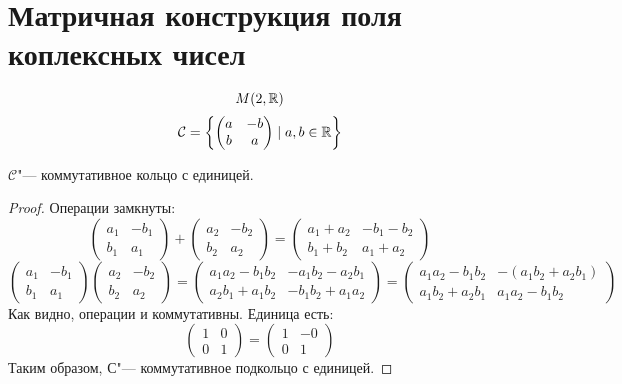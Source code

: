 \section{Матричная конструкция поля коплексных чисел}

$$M(2, \mathbb{R})$$
$$\mathcal{C} = \left\{\left(\begin{matrix}a & -b \\ b & a\end{matrix}\right) \mid a, b \in \mathbb{R}\right\}$$

\begin{assertion}
$\mathcal{C}$"--- коммутативное кольцо с единицей.
\end{assertion}
\begin{proof}
Операции замкнуты:
$$\left(\begin{matrix}a_1 & -b_1 \\ b_1 & a_1\end{matrix}\right) + \left(\begin{matrix}a_2 & -b_2 \\ b_2 & a_2\end{matrix}\right) = \left(\begin{matrix}a_1+a_2 & -b_1-b_2 \\ b_1+b_2 & a_1+a_2\end{matrix}\right)$$
$$\left(\begin{matrix}a_1 & -b_1 \\ b_1 & a_1\end{matrix}\right) \left(\begin{matrix}a_2 & -b_2 \\ b_2 & a_2\end{matrix}\right) = \left(\begin{matrix}a_1a_2-b_1b_2 & -a_1b_2-a_2b_1 \\ a_2b_1+a_1b_2 & -b_1b_2+a_1a_2\end{matrix}\right) = \left(\begin{matrix}a_1a_2-b_1b_2 & -(a_1b_2+a_2b_1) \\ a_1b_2+a_2b_1 & a_1a_2-b_1b_2\end{matrix}\right)$$
Как видно, операции и коммутативны.
Единица есть:
$$\left(\begin{matrix}1 & 0 \\ 0 & 1\end{matrix}\right) = \left(\begin{matrix}1 & -0 \\ 0 & 1\end{matrix}\right)$$
Таким образом, $\mathcal{С}$"--- коммутативное подкольцо с единицей.
\end{proof}

